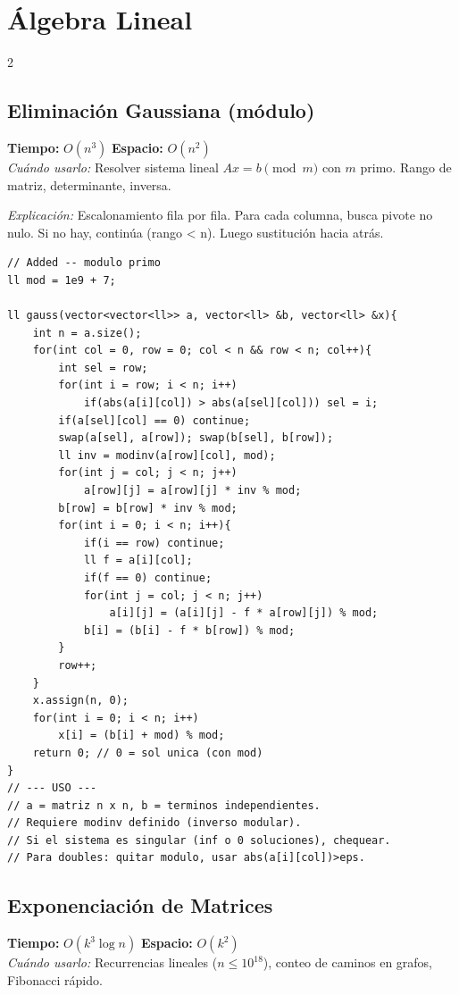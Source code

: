 \documentclass[10pt,a4paper]{article}
\begin{document}
\section{\'Algebra Lineal}
\begin{multicols}{2}

\subsection{Eliminaci\'on Gaussiana (m\'odulo)}
\textbf{Tiempo:} $O(n^3)$ \quad \textbf{Espacio:} $O(n^2)$\\
\textit{Cu\'ando usarlo:} Resolver sistema lineal $Ax = b \pmod m$ con $m$ primo. Rango de matriz, determinante, inversa.

\textit{Explicaci\'on:} Escalonamiento fila por fila. Para cada columna, busca pivote no nulo. Si no hay, contin\'ua (rango < n). Luego sustituci\'on hacia atr\'as.

\begin{lstlisting}
// Added -- modulo primo
ll mod = 1e9 + 7;

ll gauss(vector<vector<ll>> a, vector<ll> &b, vector<ll> &x){
    int n = a.size();
    for(int col = 0, row = 0; col < n && row < n; col++){
        int sel = row;
        for(int i = row; i < n; i++)
            if(abs(a[i][col]) > abs(a[sel][col])) sel = i;
        if(a[sel][col] == 0) continue;
        swap(a[sel], a[row]); swap(b[sel], b[row]);
        ll inv = modinv(a[row][col], mod);
        for(int j = col; j < n; j++)
            a[row][j] = a[row][j] * inv % mod;
        b[row] = b[row] * inv % mod;
        for(int i = 0; i < n; i++){
            if(i == row) continue;
            ll f = a[i][col];
            if(f == 0) continue;
            for(int j = col; j < n; j++)
                a[i][j] = (a[i][j] - f * a[row][j]) % mod;
            b[i] = (b[i] - f * b[row]) % mod;
        }
        row++;
    }
    x.assign(n, 0);
    for(int i = 0; i < n; i++)
        x[i] = (b[i] + mod) % mod;
    return 0; // 0 = sol unica (con mod)
}
// --- USO ---
// a = matriz n x n, b = terminos independientes.
// Requiere modinv definido (inverso modular).
// Si el sistema es singular (inf o 0 soluciones), chequear.
// Para doubles: quitar modulo, usar abs(a[i][col])>eps.
\end{lstlisting}

\subsection{Exponenciaci\'on de Matrices}
\textbf{Tiempo:} $O(k^3 \log n)$ \quad \textbf{Espacio:} $O(k^2)$\\
\textit{Cu\'ando usarlo:} Recurrencias lineales ($n \leq 10^{18}$), conteo de caminos en grafos, Fibonacci r\'apido.


\end{multicols}
\end{document}
